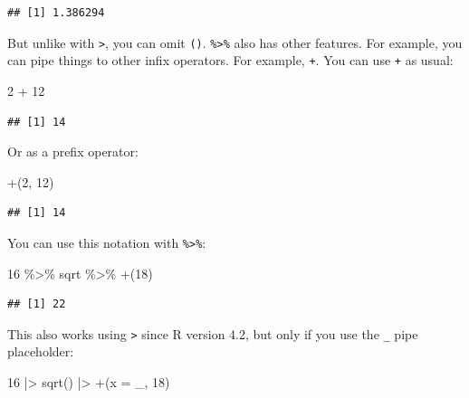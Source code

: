 \documentclass[
]{article}
\newenvironment{Shaded}{\begin{snugshade}}{\end{snugshade}}
\newcommand{\AttributeTok}[1]{\textcolor[rgb]{0.77,0.63,0.00}{#1}}
\newcommand{\DecValTok}[1]{\textcolor[rgb]{0.00,0.00,0.81}{#1}}
\newcommand{\FunctionTok}[1]{\textcolor[rgb]{0.00,0.00,0.00}{#1}}
\newcommand{\NormalTok}[1]{#1}
\newcommand{\SpecialCharTok}[1]{\textcolor[rgb]{0.00,0.00,0.00}{#1}}
\newcommand{\StringTok}[1]{\textcolor[rgb]{0.31,0.60,0.02}{#1}}
\begin{document}
\begin{verbatim}
## [1] 1.386294
\end{verbatim}

But unlike with \texttt{\textbar{}\textgreater{}}, you can omit \texttt{()}. \texttt{\%\textgreater{}\%} also has other features. For example, you can
pipe things to other infix operators. For example, \texttt{+}. You can use \texttt{+} as usual:

\begin{Shaded}
\begin{Highlighting}[]
\DecValTok{2} \SpecialCharTok{+} \DecValTok{12}
\end{Highlighting}
\end{Shaded}

\begin{verbatim}
## [1] 14
\end{verbatim}

Or as a prefix operator:

\begin{Shaded}
\begin{Highlighting}[]
\StringTok{\textasciigrave{}}\AttributeTok{+}\StringTok{\textasciigrave{}}\NormalTok{(}\DecValTok{2}\NormalTok{, }\DecValTok{12}\NormalTok{)}
\end{Highlighting}
\end{Shaded}

\begin{verbatim}
## [1] 14
\end{verbatim}

You can use this notation with \texttt{\%\textgreater{}\%}:

\begin{Shaded}
\begin{Highlighting}[]
\DecValTok{16} \SpecialCharTok{\%\textgreater{}\%}\NormalTok{ sqrt }\SpecialCharTok{\%\textgreater{}\%} \StringTok{\textasciigrave{}}\AttributeTok{+}\StringTok{\textasciigrave{}}\NormalTok{(}\DecValTok{18}\NormalTok{)}
\end{Highlighting}
\end{Shaded}

\begin{verbatim}
## [1] 22
\end{verbatim}

This also works using \texttt{\textbar{}\textgreater{}} since R version 4.2, but only if you use the \texttt{\_} pipe placeholder:

\begin{Shaded}
\begin{Highlighting}[]
\DecValTok{16} \SpecialCharTok{|\textgreater{}} \FunctionTok{sqrt}\NormalTok{() }\SpecialCharTok{|\textgreater{}} \StringTok{\textasciigrave{}}\AttributeTok{+}\StringTok{\textasciigrave{}}\NormalTok{(}\AttributeTok{x =}\NormalTok{ \_, }\DecValTok{18}\NormalTok{)}
\end{Highlighting}
\end{Shaded}
\end{document}
